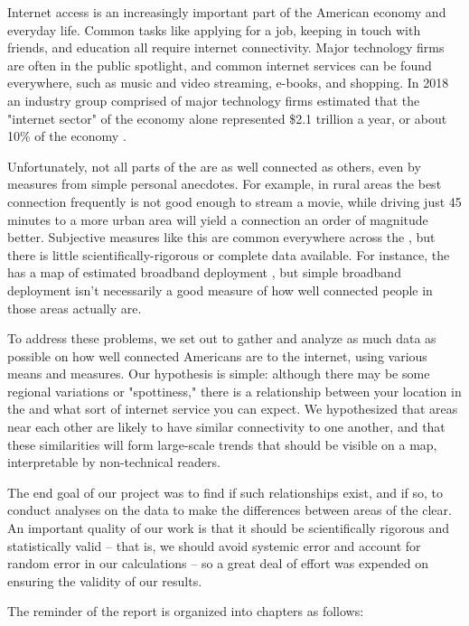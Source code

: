Internet access is an increasingly important part of the American economy and everyday life. Common tasks like applying for a job, keeping in touch with friends, and education all require internet connectivity. Major technology firms are often in the public spotlight, and common internet services can be found everywhere, such as music and video streaming, e-books, and shopping. In 2018 an industry group comprised of major technology firms estimated that the "internet sector" of the economy alone represented \$2.1 trillion a year, or about 10\% of the \us economy \cite{Shepardson2019a}.

Unfortunately, not all parts of the \us are as well connected as others, even by measures from simple personal anecdotes. For example, in rural areas the best connection frequently is not good enough to stream a movie, while driving just 45 minutes to a more urban area will yield a connection an order of magnitude better. Subjective measures like this are common everywhere across the \us, but there is little scientifically-rigorous or complete data available. For instance, the \fcc has a map of estimated broadband deployment \cite{FederalCommunicationsCommission}, but simple broadband deployment isn't necessarily a good measure of how well connected people in those areas actually are.

To address these problems, we set out to gather and analyze as much data as possible on how well connected Americans are to the internet, using various means and measures. Our hypothesis is simple: although there may be some regional variations or "spottiness," there is a relationship between your location in the \us and what sort of internet service you can expect. We hypothesized that areas near each other are likely to have similar connectivity to one another, and that these similarities will form large-scale trends that should be visible on a map, interpretable by non-technical readers.

The end goal of our project was to find if such relationships exist, and if so, to conduct analyses on the data to make the differences between areas of the \us clear. An important quality of our work is that it should be scientifically rigorous and statistically valid -- that is, we should avoid systemic error and account for random error in our calculations -- so a great deal of effort was expended on ensuring the validity of our results.

The reminder of the report is organized into chapters as follows:

